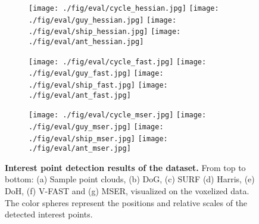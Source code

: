 \begin{figure}[ht]
\begin{subfigure}[t]{1\linewidth}
		\label{fig/eval/mesh/hessian}	
		\makebox[0.15\linewidth]{\raisebox{0.07\linewidth}{(e) DoH}} 
		\texttt{[image: ./fig/eval/cycle\_hessian.jpg]} 
		\texttt{[image: ./fig/eval/guy\_hessian.jpg]} 
		\texttt{[image: ./fig/eval/ship\_hessian.jpg]}
		\texttt{[image: ./fig/eval/ant\_hessian.jpg]} 
	\end{subfigure}
	\begin{subfigure}[t]{1\linewidth} \centering 
		\label{fig/eval/mesh/fast}	
		\makebox[0.15\linewidth]{\raisebox{0.07\linewidth}{(f) VFAST}} 
		\texttt{[image: ./fig/eval/cycle\_fast.jpg]} 
		\texttt{[image: ./fig/eval/guy\_fast.jpg]} 
		\texttt{[image: ./fig/eval/ship\_fast.jpg]}
		\texttt{[image: ./fig/eval/ant\_fast.jpg]} 
	\end{subfigure}
	\begin{subfigure}[t]{1\linewidth} \centering 
		\label{fig/eval/mesh/mser}	
		\makebox[0.15\linewidth]{\raisebox{0.07\linewidth}{(g) MSER}} 
		\texttt{[image: ./fig/eval/cycle\_mser.jpg]} 
		\texttt{[image: ./fig/eval/guy\_mser.jpg]} 
		\texttt{[image: ./fig/eval/ship\_mser.jpg]}
		\texttt{[image: ./fig/eval/ant\_mser.jpg]} 
	\end{subfigure}
	\caption{\textbf{Interest point detection results of the \meshset dataset.} From top to bottom: (a) Sample point clouds, (b) DoG, (c) SURF (d) Harris, (e) DoH, (f) V-FAST and (g) MSER, visualized on the voxelized data. The color spheres represent the positions and relative scales of the detected interest points.}
	\label{fig/eval/mesh}
\end{figure}

